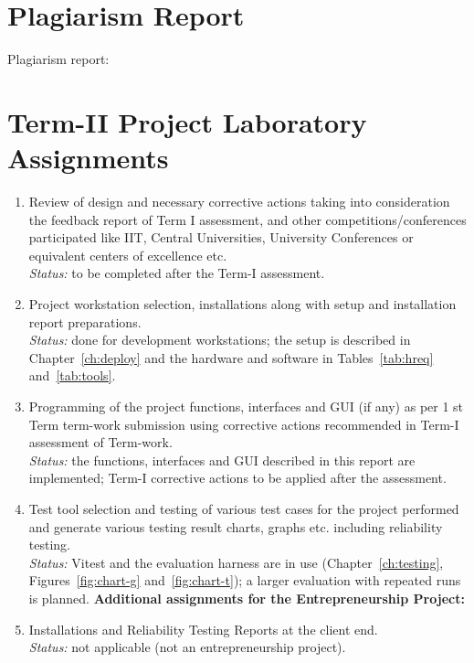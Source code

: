 \documentclass[oneside,a4paper,12pt]{report}
\begin{document}
\begin{appendices}
\begin{enumerate}
\end{enumerate}

\chapter{Plagiarism Report}
Plagiarism report:
\chapter{ Term-II Project Laboratory Assignments}
\begin{enumerate}
\item Review of design and necessary corrective actions taking into consideration the feedback report of Term I assessment, and other competitions/conferences participated like IIT, Central Universities, University Conferences or equivalent centers of excellence etc.\\
\emph{Status:} to be completed after the Term-I assessment.
\item Project workstation selection, installations along with setup and installation report preparations.\\
\emph{Status:} done for development workstations; the setup is described in Chapter~\ref{ch:deploy} and the hardware and software in Tables~\ref{tab:hreq} and~\ref{tab:tools}.
\item Programming of the project functions, interfaces and GUI (if any) as per 1 st Term term-work submission using corrective actions recommended in Term-I assessment of Term-work.\\
\emph{Status:} the functions, interfaces and GUI described in this report are implemented; Term-I corrective actions to be applied after the assessment.
\item Test tool selection and testing of various test cases for the project performed and generate various testing result charts, graphs etc. including reliability testing.\\
\emph{Status:} Vitest and the evaluation harness are in use (Chapter~\ref{ch:testing}, Figures~\ref{fig:chart-g} and~\ref{fig:chart-t}); a larger evaluation with repeated runs is planned.
\textbf{Additional assignments for the Entrepreneurship Project:}
\item Installations and Reliability Testing Reports at the client end.\\
\emph{Status:} not applicable (not an entrepreneurship project).

\end{enumerate}

\end{appendices}
\end{document}
